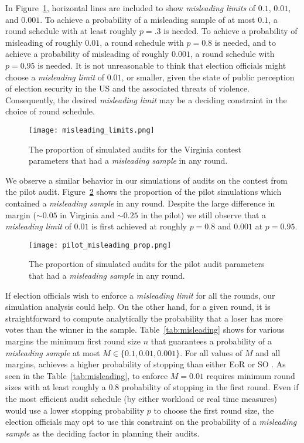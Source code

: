 In Figure~\ref{fig:misleading}, horizontal lines are included to show \emph{misleading limits} of $0.1$, $0.01$, and $0.001$.
To achieve a probability of a misleading sample of at most $0.1$, a round schedule with at least roughly $p=.3$ is needed.
To achieve a probability of misleading of roughly $0.01$, a round schedule with $p=0.8$ is needed, and to achieve a probability of misleading of roughly $0.001$, a round schedule with $p=0.95$ is needed.
It is not unreasonable to think that election officials might choose a \emph{misleading limit} of $0.01$, or smaller, given the state of public perception of election security in the US and the associated threats of violence.
Consequently, the desired \emph{misleading limit} may be a deciding constraint in the choice of round schedule. 

\begin{figure}
\texttt{[image: misleading\_limits.png]}
\caption{The proportion of simulated \Providence audits for the Virginia contest parameters that had a \emph{misleading sample} in any round.}
\label{fig:misleading}
\end{figure}

We observe a similar behavior in our simulations of audits on the contest from the pilot audit. Figure~\ref{fig:pilot_misleading} shows the proportion of the pilot simulations which contained a \emph{misleading sample} in any round. Despite the large difference in margin ($\sim 0.05$ in Virginia and $\sim 0.25$ in the pilot) we still observe that a \emph{misleading limit} of $0.01$ is first achieved at roughly $p=0.8$ and $0.001$ at $p=0.95$.

\begin{figure}
\texttt{[image: pilot\_misleading\_prop.png]}
\caption{The proportion of simulated \Providence audits for the pilot audit parameters that had a \emph{misleading sample} in any round.}
\label{fig:pilot_misleading}
\end{figure}

If election officials wish to enforce a \emph{misleading limit} for all the rounds, our simulation analysis could help. On the other hand, for a given round, it is straightforward to compute analytically the probability that a loser has more votes than the winner in the sample. Table~\ref{tab:misleading} shows for various margins the minimum first round size $n$ that guarantees a probability of a \emph{misleading sample} at most $M\in\{0.1,0.01,0.001\}$. For all values of $M$ and all margins, \Providence achieves a higher probability of stopping than either EoR \BRAVO or SO \BRAVO. 
    As seen in the Table~\ref{tab:misleading}, to enforce $M=0.01$ requires minimum round sizes with at least roughly a $0.8$ probability of stopping in the first round. Even if the most efficient audit schedule (by either workload or real time measures) would use a lower stopping probability $p$ to choose the first round size, the election officials may opt to use this constraint on the probability of a \emph{misleading sample} as the deciding factor in planning their audits.

